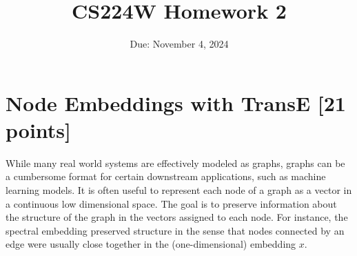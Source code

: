 \documentclass{article}
\title{CS224W Homework 2}
\date{Due: November 4, 2024}
\numberwithin{figure}{section}
\begin{document}
\maketitle

\section{Node Embeddings with TransE [21 points]}

While many real world systems are effectively modeled as graphs, graphs can be a cumbersome format for certain downstream applications, such as machine learning models. It is often useful to represent each node of a graph as a vector in a continuous low dimensional space. The goal is to preserve information about the structure of the graph in the vectors assigned to each node. For instance, the spectral embedding preserved structure in the sense that nodes connected by an edge were usually close together in the (one-dimensional) embedding $x$.\\
\end{document}
